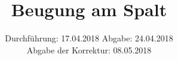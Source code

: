 

\subject{Versuch 406}
\title{Beugung am Spalt}
\date{
  Durchführung: 17.04.2018
  \hspace{3em}
  Abgabe: 24.04.2018\\
  Abgabe der Korrektur: 08.05.2018
}



\maketitle
\thispagestyle{empty}
\tableofcontents
\newpage



\newpage



\newpage
\printbibliography{}


